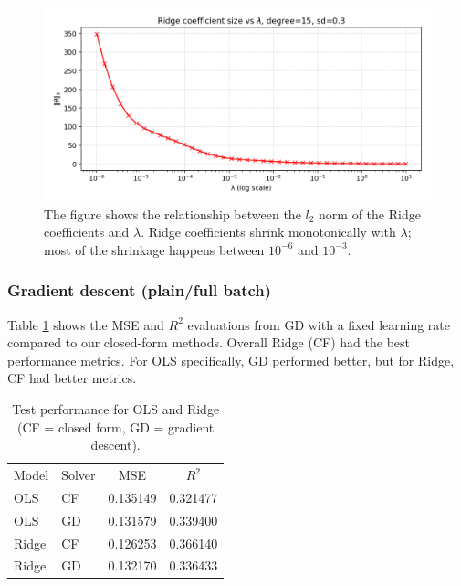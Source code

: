 \documentclass[amssymb,twocolumn,aps,floatfix]{revtex4-2}
\begin{document}
\begin{figure}[t]
    \centering
    \includegraphics[width=1\linewidth]{Project-1/Figures/ridge_theta_norms_vs_lambda.png}
    \caption{The figure shows the relationship between the $l_2$ norm of the Ridge coefficients and $\lambda$. Ridge coefficients shrink monotonically with $\lambda$; most of the shrinkage happens between $10^{-6}$ and $10^{-3}$.}
    \label{fig:ridge_theta_norms}
\end{figure}

\subsubsection{Gradient descent (plain/full batch)}

Table \ref{tab:test-ols-ridge} shows the MSE and $R^2$ evaluations from GD with a fixed learning rate compared to our closed-form methods. Overall Ridge (CF) had the best performance metrics. For OLS specifically, GD performed better, but for Ridge, CF had better metrics. 

\begin{table}[h!]  %
\caption{Test performance for OLS and Ridge (CF = closed form, GD = gradient descent).}
\label{tab:test-ols-ridge}
\begin{ruledtabular}
\begin{tabular}{llcc} %
Model & Solver & MSE & $R^2$ \\
\colrule
OLS   & CF & 0.135149 & 0.321477 \\
OLS   & GD & 0.131579 & 0.339400 \\
Ridge & CF & 0.126253 & 0.366140 \\
Ridge & GD & 0.132170 & 0.336433 \\
\end{tabular}
\end{ruledtabular}
\end{table}
\end{document}
